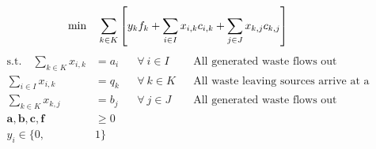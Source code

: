 \documentclass[12pt]{amsart}
\begin{document}
\[ \min \quad \sum_{k\in K} \left[ y_kf_k + \sum_{i\in I} x_{i,k}c_{i,k} + \sum_{j\in J} x_{k,j}c_{k,j} \right]
	\hspace{10ex} \]
\begin{align*} 
	\text{s.t.}\quad
	\sum_{k\in K} x_{i,k} &= a_i & & \forall\ i\in I & & \text{All generated waste flows out}  \\
	\sum_{i\in I} x_{i,k} &= q_k & & \forall\ k\in K & & \text{All waste leaving sources arrive at a processing facility.}  \\
	\sum_{k\in K} x_{k,j} &= b_j & & \forall\ j\in J & & \text{All generated waste flows out}  \\
	\mathbf{a,b,c,f} &\geq 0 \\
	y_i \in \{0,&1\}
\end{align*}
\end{document}
